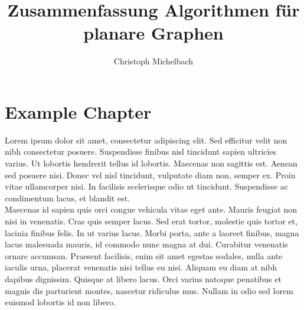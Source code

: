 \documentclass[a4paper,11pt]{report}
\title{Zusammenfassung Algorithmen für planare Graphen}
\author{Christoph Michelbach}
\begin{document}
\maketitle
\tableofcontents

\chapter{Example Chapter}


Lorem ipsum dolor sit amet, consectetur adipiscing elit. Sed efficitur velit non nibh consectetur posuere. Suspendisse finibus nisl tincidunt sapien ultricies varius. Ut lobortis hendrerit tellus id lobortis. Maecenas non sagittis est. Aenean sed posuere nisi. Donec vel nisl tincidunt, vulputate diam non, semper ex. Proin vitae ullamcorper nisi. In facilisis scelerisque odio ut tincidunt. Suspendisse ac condimentum lacus, et blandit est.\\

Maecenas id sapien quis orci congue vehicula vitae eget ante. Mauris feugiat non nisi in venenatis. Cras quis semper lacus. Sed erat tortor, molestie quis tortor et, lacinia finibus felis. In ut varius lacus. Morbi porta, ante a laoreet finibus, magna lacus malesuada mauris, id commodo nunc magna at dui. Curabitur venenatis ornare accumsan. Praesent facilisis, enim sit amet egestas sodales, nulla ante iaculis urna, placerat venenatis nisi tellus eu nisi. Aliquam eu diam at nibh dapibus dignissim. Quisque at libero lacus. Orci varius natoque penatibus et magnis dis parturient montes, nascetur ridiculus mus. Nullam in odio sed lorem euismod lobortis id non libero.


\glsaddallunused
\printglossaries
\end{document}
